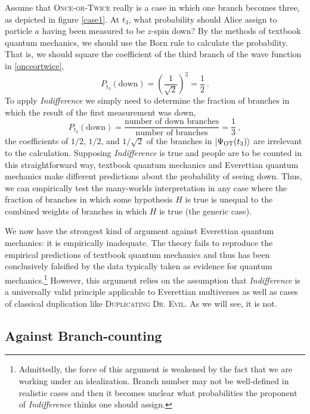 \documentclass[onecolumn,secnumarabic,amsmath,amssymb,balancelastpage,nofootinbib]{article}
\newcommand{\ket}[1]{\ensuremath{\left|#1\right\rangle}}
\begin{document}
Assume that \textsc{Once-or-Twice} really is a case in which one branch becomes three, as depicted in figure \ref{case1}.  At $t_3$, what probability should Alice assign to particle $a$ having been measured to be $z$-spin down?  By the methods of textbook quantum mechanics, we should use the Born rule to calculate the probability.  That is, we should square the coefficient of the third branch of the wave function in \eqref{onceortwice},
\begin{equation}
P_{t_3}(\text{down})=\left(\frac{1}{\sqrt{2}}\right)^2=\frac{1}{2}\ .
\end{equation}
To apply \emph{Indifference} we simply need to determine the fraction of branches in which the result of the first measurement was down,
\begin{equation}
P_{t_3}(\text{down})=\frac{\text{number of down branches}}{\text{number of branches}}=\frac{1}{3}\ ,
\label{indifferencet3}
\end{equation}
the coefficients of $1/2$, $1/2$, and $1/\sqrt{2}$ of the branches in $\ket{\Psi_{\textsc{OT}}(t_3)}$ are irrelevant to the calculation.  Supposing \emph{Indifference} is true and people are to be counted in this straightforward way, textbook quantum mechanics and Everettian quantum mechanics make different predictions about the probability of seeing down.  Thus, we can empirically test the many-worlds interpretation in any case where the fraction of branches in which some hypothesis $H$ is true is unequal to the combined weights of branches in which $H$ is true (the generic case).

We now have the strongest kind of argument against Everettian quantum mechanics: it is empirically inadequate.  The theory fails to reproduce the empirical predictions of textbook quantum mechanics and thus has been conclusively falsified by the data typically taken as evidence for quantum mechanics.\footnote{Admittedly, the force of this argument is weakened by the fact that we are working under an idealization.  Branch number may not be well-defined in realistic cases and then it becomes unclear what probabilities the proponent of \emph{Indifference} thinks one should assign.}  However, this argument relies on the assumption that \emph{Indifference} is a universally valid principle applicable to Everettian multiverses as well as cases of classical duplication like \textsc{Duplicating Dr. Evil}.  As we will see, it is not.

\subsection{Against Branch-counting}\label{response}
\end{document}
